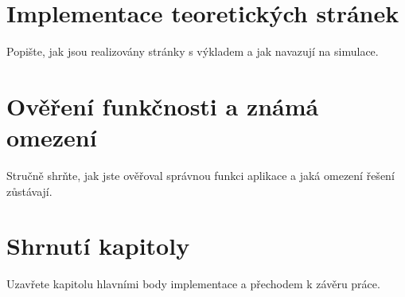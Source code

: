 \section{Implementace teoretických stránek}
Popište, jak jsou realizovány stránky s výkladem a jak navazují na simulace.

\section{Ověření funkčnosti a známá omezení}
Stručně shrňte, jak jste ověřoval správnou funkci aplikace a jaká omezení řešení zůstávají.

\section{Shrnutí kapitoly}
Uzavřete kapitolu hlavními body implementace a přechodem k závěru práce.
